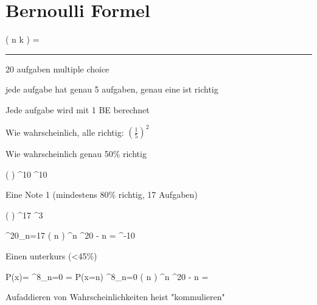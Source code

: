 
\section{Bernoulli Formel}

\startformula
(\startpmatrix
	   \NC n \NR
	   \NC k \NR
\stoppmatrix) = 
\stopformula

\blank
\hrule
\blank

\startitemize[packed]
\item 20 aufgaben multiple choice
\item jede aufgabe hat genau 5 aufgaben, genau eine ist richtig
\item Jede aufgabe wird mit 1 BE berechnet
\stopitemize

Wie wahrscheinlich,  alle richtig: $(\frac{1}{5})^2$

Wie wahrscheinlich genau 50\% richtig

\startformula
(\startpmatrix
	    \NR
	    \NR
\stoppmatrix) ^{10} ^{10}
\stopformula

{\bfa Eine Note 1 (mindestens 80\% richtig, 17 Aufgaben)}

\startformula
(\startpmatrix
	    \NR
	    \NR
\stoppmatrix) ^{17} ^{3}
\stopformula

\startformula
\sum^{20}_{n=17} 
(\startpmatrix
	    \NR
	   \NC n \NR
\stoppmatrix) ^{n} ^{20 - n} =   ^{-10}
\stopformula

\blank
{\bfa Einen unterkurs (<45\%)}
\blank


\startformula
P(x)=
\sum^{8}_{n=0} = P(x=n)
\sum^{8}_{n=0} 
(\startpmatrix
	    \NR
	   \NC n \NR
\stoppmatrix) ^{n} ^{20 - n} =  
\stopformula

\startdefinition[title={Kommulieren}]
Aufaddieren von Wahrscheinlichkeiten heist "kommulieren"
\stopdefinition
